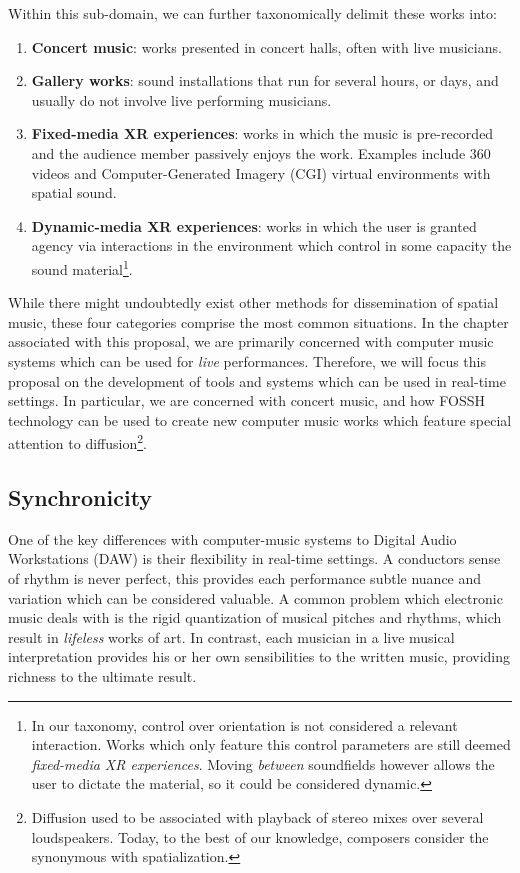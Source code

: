 Within this sub-domain, we can further taxonomically delimit these works into:
\begin{enumerate}
    \item \textbf{Concert music}: works presented in concert halls, often with live musicians. 
    \item \textbf{Gallery works}: sound installations that run for several hours, or days, and usually do not involve live performing musicians. 
    \item \textbf{Fixed-media XR experiences}: works in which the music is pre-recorded and the audience member passively enjoys the work. Examples include 360 videos and Computer-Generated Imagery (CGI) virtual environments with spatial sound. 
    \item \textbf{Dynamic-media XR experiences}: works in which the user is granted agency via interactions in the environment which control in some capacity the sound material\footnote{In our taxonomy, control over orientation is not considered a relevant interaction. Works which only feature this control parameters are still deemed \textit{fixed-media XR experiences}. Moving \textit{between} soundfields however allows the user to dictate the material, so it could be considered dynamic.}.
\end{enumerate}

While there might undoubtedly exist other methods for dissemination of spatial music, these four categories comprise the most common situations. In the chapter associated with this proposal, we are primarily concerned with computer music systems which can be used for \textit{live} performances. Therefore, we will focus this proposal on the development of tools and systems which can be used in real-time settings. In particular, we are concerned with concert music, and how FOSSH technology can be used to create new computer music works which feature special attention to diffusion\footnote{Diffusion used to be associated with playback of stereo mixes over several loudspeakers. Today, to the best of our knowledge, composers consider the synonymous with spatialization.}.

\subsection{Synchronicity}

One of the key differences with computer-music systems to Digital Audio Workstations (DAW) is their flexibility in real-time settings. A conductors sense of rhythm is never perfect, this provides each performance subtle nuance and variation which can be considered valuable. A common problem which electronic music deals with is the rigid quantization of musical pitches and rhythms, which result in \textit{lifeless} works of art. In contrast, each musician in a live musical interpretation provides his or her own sensibilities to the written music, providing richness to the ultimate result. 

